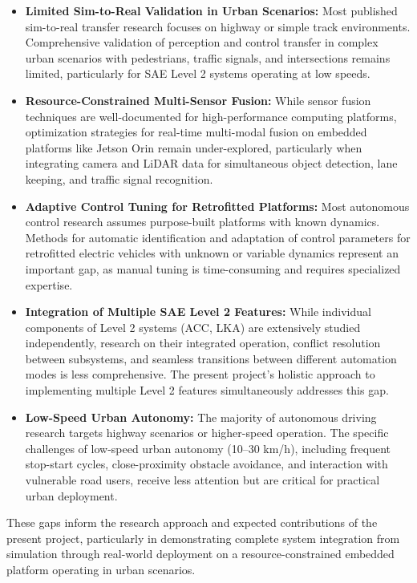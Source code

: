 \documentclass[12pt, a4paper]{report}
\begin{document}
\begin{itemize}
    \item \textbf{Limited Sim-to-Real Validation in Urban Scenarios:} Most published sim-to-real transfer research focuses on highway or simple track environments. Comprehensive validation of perception and control transfer in complex urban scenarios with pedestrians, traffic signals, and intersections remains limited, particularly for \ac{SAE} Level 2 systems operating at low speeds.
    
    \item \textbf{Resource-Constrained Multi-Sensor Fusion:} While sensor fusion techniques are well-documented for high-performance computing platforms, optimization strategies for real-time multi-modal fusion on embedded platforms like Jetson Orin remain under-explored, particularly when integrating camera and \ac{LiDAR} data for simultaneous object detection, lane keeping, and traffic signal recognition.
    
    \item \textbf{Adaptive Control Tuning for Retrofitted Platforms:} Most autonomous control research assumes purpose-built platforms with known dynamics. Methods for automatic identification and adaptation of control parameters for retrofitted electric vehicles with unknown or variable dynamics represent an important gap, as manual tuning is time-consuming and requires specialized expertise.
    
    \item \textbf{Integration of Multiple \ac{SAE} Level 2 Features:} While individual components of Level 2 systems (\ac{ACC}, \ac{LKA}) are extensively studied independently, research on their integrated operation, conflict resolution between subsystems, and seamless transitions between different automation modes is less comprehensive. The present project's holistic approach to implementing multiple Level 2 features simultaneously addresses this gap.
    
    \item \textbf{Low-Speed Urban Autonomy:} The majority of autonomous driving research targets highway scenarios or higher-speed operation. The specific challenges of low-speed urban autonomy (10--30 km/h), including frequent stop-start cycles, close-proximity obstacle avoidance, and interaction with vulnerable road users, receive less attention but are critical for practical urban deployment.
\end{itemize}

These gaps inform the research approach and expected contributions of the present project, particularly in demonstrating complete system integration from simulation through real-world deployment on a resource-constrained embedded platform operating in urban scenarios.
\end{document}

